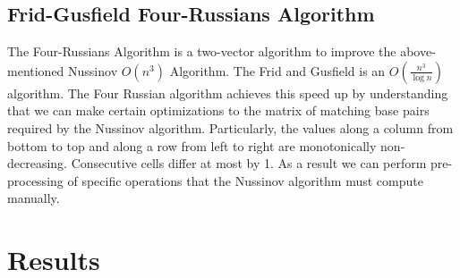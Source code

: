 \documentclass[12pt]{article}
\begin{document}
\subsection{Frid-Gusfield Four-Russians Algorithm}
\par The Four-Russians Algorithm \cite{gusfield} is a two-vector algorithm to
improve the above-mentioned Nussinov $O(n^3)$ Algorithm. The Frid and Gusfield
is an $O(\frac{n^3}{\log n})$ algorithm. The Four Russian algorithm achieves
this speed up by understanding that we can make certain optimizations to the
matrix of matching base pairs required by the Nussinov algorithm. Particularly,
the values along a column from bottom to top and along a row from left to right
are monotonically non-decreasing. Consecutive cells differ at most by 1\cite{gusfield}.
As a result we can perform pre-processing of specific operations that the
Nussinov algorithm must compute manually.

\section{Results}
\end{document}
